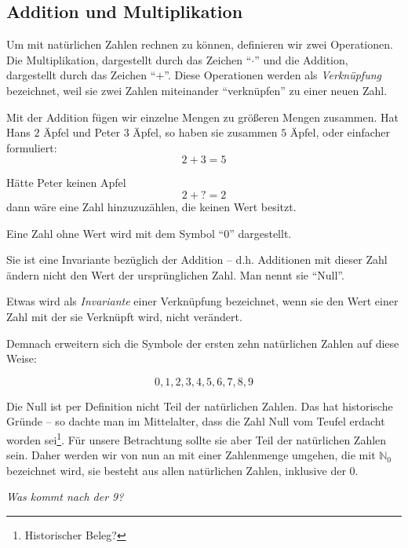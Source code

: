 \subsection{Addition und Multiplikation}

\begin{definition}
Um mit natürlichen Zahlen rechnen zu können, definieren wir zwei Operationen. Die Multiplikation, dargestellt durch das Zeichen "`$\cdot$"' und die Addition, dargestellt durch das Zeichen "`$+$"'. Diese Operationen werden als \textsl{Verknüpfung} bezeichnet, weil sie zwei Zahlen miteinander "`verknüpfen"' zu einer neuen Zahl.
\end{definition}

Mit der Addition fügen wir einzelne Mengen zu größeren Mengen zusammen. Hat Hans $2$ Äpfel und Peter $3$ Äpfel, so haben sie zusammen $5$ Äpfel, oder einfacher formuliert:
\[
2+3=5
\]

\noindent Hätte Peter keinen Apfel
\[2+?=2\]
dann wäre eine Zahl hinzuzuzählen, die keinen Wert besitzt. 
\begin{definition}
Eine Zahl ohne Wert wird mit dem Symbol "`0"' dargestellt.
\end{definition}

Sie ist eine Invariante bezüglich der Addition -- d.h. Additionen mit dieser Zahl ändern nicht den Wert der ursprünglichen Zahl. Man nennt sie "`Null"'. 

\begin{definition}
Etwas wird als \textsl{Invariante} einer Verknüpfung bezeichnet, wenn sie den Wert einer Zahl mit der sie Verknüpft wird, nicht verändert.
\end{definition}

Demnach erweitern sich die Symbole der ersten zehn natürlichen Zahlen auf diese Weise:

\[0,1,2,3,4,5,6,7,8,9\]

Die Null ist per Definition nicht Teil der natürlichen Zahlen. Das hat historische Gründe -- so dachte man im Mittelalter, dass die Zahl Null vom Teufel erdacht worden sei\footnote{Historischer Beleg?}. Für unsere Betrachtung sollte sie aber Teil der natürlichen Zahlen sein. Daher werden wir von nun an mit einer Zahlenmenge umgehen, die mit $\mathbb{N}_0$ bezeichnet wird, sie besteht aus allen natürlichen Zahlen, inklusive der 0.

\textsl{Was kommt nach der 9?}

